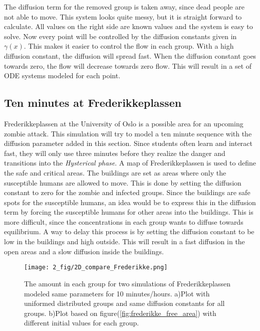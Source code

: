 \documentclass[%
twoside,                 %
final,                   %
chapterprefix=true,      %
open=right               %
10pt]{book}
\begin{document}
The diffusion term for the removed group is taken away, since dead people are not able to move. This system looks quite messy, but it is straight forward to calculate. All values on the right side are known values and the system is easy to solve. Now every point will be controlled by the diffusion constants given in $\gamma(x)$. This makes it easier to control the flow in each group. With a high diffusion constant, the diffusion will spread fast. When the diffusion constant goes towards zero, the flow will decrease towards zero flow. This will result in a set of ODE systems modeled for each point.

\subsection{Ten minutes at Frederikkeplassen}
\label{section:2_frederikke}
Frederikkeplassen at the University of Oslo is a possible area for an upcoming zombie attack. This simulation will try to model a ten minute sequence with the diffusion parameter added in this section. Since students often learn and interact fast, they will only use three minutes before they realize the danger and transitions into the \emph{Hysterical phase}. A map of Frederikkeplassen is used to define the safe and critical areas. The buildings are set as areas where only the susceptible humans are allowed to move. This is done by setting the diffusion constant to zero for the zombie and infected groups. Since the buildings are safe spots for the susceptible humans, an idea would be to express this in the diffusion term by forcing the susceptible humans for other areas into the buildings. This is more difficult, since the concentrations in each group wants to diffuse towards equilibrium. A way to delay this process is by setting the diffusion constant to be low in the buildings and high outside. This will result in a fast diffusion in the open areas and a slow diffusion inside the buildings. 


\begin{figure}[ht]
  \centerline{\texttt{[image: 2\_fig/2D\_compare\_Frederikke.png]}}
  \caption{
  \label{fig:frederikke_numbers} The amount in each group for two simulations of Frederikkeplassen modeled same parameters for 10 minutes/hours. a)Plot with uniformed distributed groups and same diffusion constants for all groups. b)Plot based on figure(\ref{fig:frederikke_free_area}) with different initial values for each group.
  }
\end{figure}
\end{document}

